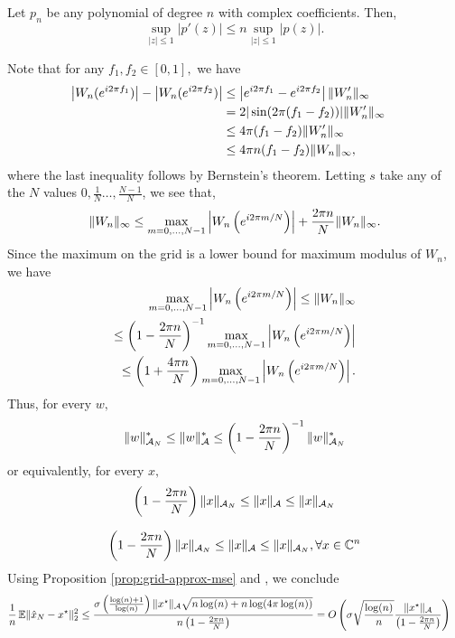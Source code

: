 \begin{theorem}
Let $p_n$ be any polynomial of degree $n$ with complex coefficients. Then,
\begin{equation*}
 \sup_{|z|\leq 1} |p'(z)|  \leq n  \sup_{|z|\leq 1} |p(z)|.
\end{equation*}
\end{theorem}
Note that for any $f_1, f_2 \in [0,1],$ we have
\begin{align*}
  \left|W_n(e^{i2\pi f_1})\right| - \left|W_n(e^{i2\pi f_2})\right|  &\leq   \left|e^{i2\pi f_1} - e^{i2\pi f_2}\right| \lVert W_n'\rVert_\infty&&\\
  &= 2|\sin(2\pi (f_1-f_2))| \lVert W_n'\rVert_\infty\\
  &\leq 4 \pi (f_1-f_2) \lVert W_n'\rVert_\infty\label{diff}\\
  & \leq 4 \pi n (f_1-f_2) \lVert W_n\rVert_\infty,
\end{align*}
where the last inequality follows by Bernstein's theorem.
Letting $s$ take any of the $N$ values $0,\tfrac{1}{N} \ldots, \tfrac{N-1}{N}$, we see that,
\begin{equation*}
\lVert W_n\rVert_\infty \leq \max_{m=0,\ldots,N-1}\left| W_n\left(e^{i 2 \pi m/N}\right) \right| + \frac{2\pi n}{N}\lVert W_n\rVert_\infty.
\end{equation*}
Since the maximum on the grid is a lower bound for maximum modulus of $W_n$, we have
\begin{align}
\max_{m=0,\ldots,N-1} \left| W_n\left(e^{i 2 \pi m/N}\right) \right| \leq \lVert W_n\rVert_\infty \\
\leq  \left(1-\frac{2\pi n}{N}\right)^{-1} \max_{m=0,\ldots,N-1} \left| W_n\left(e^{i 2 \pi m/N}\right) \right|\nonumber\\
 \leq  \left(1+\frac{4\pi n}{N}\right) \max_{m=0,\ldots,N-1} \left| W_n\left(e^{i 2 \pi m/N}\right) \right|.
\label{eq:grid-approx}
\end{align}
Thus, for every $w,$
\begin{equation}
\lVert w\rVert_{\mathcal{A}_N}^* \leq  \lVert w\rVert_{\mathcal{A}}^* \leq  \left(1-\frac{2\pi n}{N}\right)^{-1} \lVert w\rVert_{\mathcal{A}_N}^*
\end{equation}
or equivalently, for every $x,$
\begin{equation}
 \left(1-\frac{2\pi n}{N}\right) \lVert x\rVert_{\mathcal{A}_N} \leq  \lVert x\rVert_{\mathcal{A}} \leq \lVert x\rVert_{\mathcal{A}_N}
\end{equation}

\begin{equation}
 \left(1-\frac{2\pi n}{N}\right) \lVert x\rVert_{\mathcal{A}_N} \leq  \lVert x\rVert_{\mathcal{A}} \leq \lVert x\rVert_{\mathcal{A}_N}, \forall x \in \mathbb{C}^n
\end{equation}
Using Proposition
\ref{prop:grid-approx-mse} and , we conclude
{\small
\begin{align*}
\frac{1}{n} \operatorname{\mathbb{E}} \lVert\hat{x}_N - x^\star\rVert_2^2 
&\leq
\frac{\sigma\left(\frac{\log(n)+1}{\log(n)}\right)\lVert x^\star\rVert_{\mathcal{A}}
\sqrt{ n \log(n) + 
    n\log(4\pi\log(n))
}}{n\left(1 - \frac{2\pi n}{N}\right)} =
O\left(
\sigma \sqrt{\frac{\log(n)}{n}} \frac{ \lVert x^\star\rVert_{\mathcal{A}}}{\left(1 - \frac{2\pi n}{N}\right)}
\right)
\end{align*}
}


